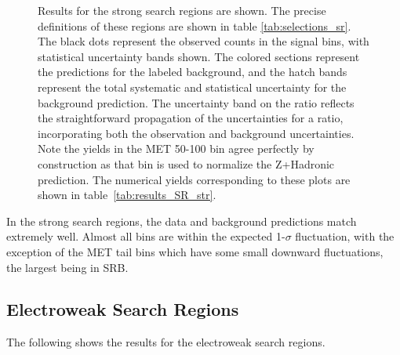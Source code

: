 \begin{figure}[!htb]
      \caption[Results for the strong search regions are shown. The precise definitions of these regions are shown in table \ref{tab:selections_sr}.]{\label{fig:results_SR_str} Results for the strong search regions are shown. The precise definitions of these regions are shown in table \ref{tab:selections_sr}.  The black dots represent the observed counts in the signal bins, with statistical uncertainty bands shown. The colored sections represent the predictions for the labeled background, and the hatch bands represent the total systematic and statistical uncertainty for the background prediction. The uncertainty band on the ratio reflects the straightforward propagation of the uncertainties for a ratio, incorporating both the observation and background uncertainties. Note the yields in the MET 50-100 bin agree perfectly by construction as that bin is used to normalize the Z+Hadronic prediction. The numerical yields corresponding to these plots are shown in table~\ref{tab:results_SR_str}.
      }
    \end{figure}

    In the strong search regions, the data and background predictions match extremely well. Almost all bins are within the expected 1-$\sigma$ fluctuation, with the exception of the MET tail bins which have some small downward fluctuations, the largest being in SRB.

  \clearpage

  \subsection{Electroweak Search Regions}

    The following shows the results for the electroweak search regions. 

